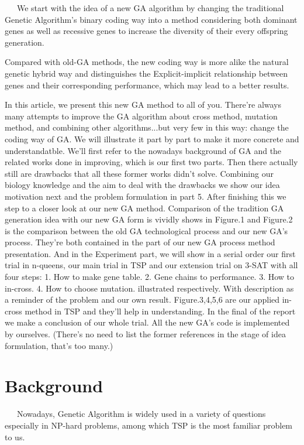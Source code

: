 \documentclass{acmtog} %
\begin{document}
\ \ \ We start with the idea of a new GA algorithm by changing the traditional Genetic Algorithm's binary coding way into a method considering both dominant genes as well as recessive genes to increase the diversity of their every offspring generation.

Compared with old-GA methods, the new coding way is more alike the natural genetic hybrid way and distinguishes the Explicit-implicit relationship between genes and their corresponding performance, which may lead to a  better results.
    
In this article, we present this new GA method to all of you. There're always many attempts to improve the GA algorithm about cross method, mutation method, and combining other algorithms...but very few in this way: change the coding way of GA. We will illustrate it part by part to make it more concrete and understandatble. We'll first refer to the nowadays background of GA and the related works done in improving, which is our first two parts. Then there actually still are drawbacks that all these former works didn't solve. Combining our biology knowledge and the aim to deal with the drawbacks we show our idea motivation next and the problem formulation in part 5. After finishing this we step to a closer look at our new GA method.  Comparison of the tradition GA generation idea with our new GA form is vividly shows in Figure.1 and Figure.2 is the comparison  between  the  old  GA  technological  process  and  our
new GA’s process. They're both contained in the part of our new GA process method presentation. And in the Experiment part, we will show in a serial order our first trial in n-queens, our main trial in TSP and our extension trial on 3-SAT with all four steps:
1. How to make gene table. 
2. Gene chains to performance. 
3. How to in-cross. 
4. How to choose mutation. 
illustrated respectively. With description as a reminder of the problem and our own result. Figure.3,4,5,6 are our applied in-cross method in TSP and they'll help in understanding. In the final of the report we make a conclusion of our whole trial. All the new GA's code is implemented by ourselves. (There's no need to list the former references in the stage of idea formulation, that's too many.)


\section{Background}
\label{sec:background}
\ \ \ Nowadays, Genetic Algorithm is widely used in a variety of questions especially in NP-hard problems, among which TSP is the most familiar problem to us.
\end{document}
